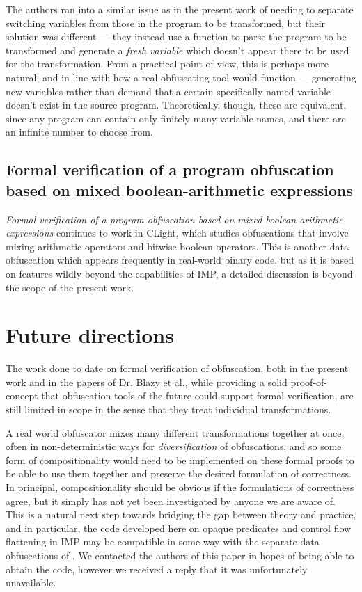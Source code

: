 \documentclass[12pt,notitlepage]{report}
\theoremstyle{plain}
\theoremstyle{definition}
\newcommand{\define}[1]{\emph{#1}\index{#1}}
\numberwithin{equation}{section}
\begin{document}
\par The authors ran into a similar issue as in the present work of needing to separate switching variables from those in the program to be transformed, but their solution was different --- they instead use a function to parse the program to be transformed and generate a \define{fresh variable} which doesn't appear there to be used for the transformation.  From a practical point of view, this is perhaps more natural, and in line with how a real obfuscating tool would function --- generating new variables rather than demand that a certain specifically named variable doesn't exist in the source program.  Theoretically, though, these are equivalent, since any program can contain only finitely many variable names, and there are an infinite number to choose from. 

\subsection*{Formal verification of a program obfuscation based on mixed boolean-arithmetic expressions}
\par \emph{Formal verification of a program obfuscation based on mixed boolean-arithmetic expressions} \cite{Blazy3} continues to work in CLight, which studies obfuscations that involve mixing arithmetic operators and bitwise boolean operators.  This is another data obfuscation which appears frequently in real-world binary code, but as it is based on features wildly beyond the capabilities of IMP, a detailed discussion is beyond the scope of the present work.

\section{Future directions}
The work done to date on formal verification of obfuscation, both in the present work and in the papers of Dr. Blazy et al., while providing a solid proof-of-concept that obfuscation tools of the future could support formal verification, are still limited in scope in the sense that they treat individual transformations.
\par A real world obfuscator mixes many different transformations together at once, often in non-deterministic ways for \define{diversification} of obfuscations, and so some form of compositionality would need to be implemented on these formal proofs to be able to use them together and preserve the desired formulation of correctness.  In principal, compositionality should be obvious if the formulations of correctness agree, but it simply has not yet been investigated by anyone we are aware of.  This is a natural next step towards bridging the gap between theory and practice, and in particular, the code developed here on opaque predicates and control flow flattening in IMP may be compatible in some way with the separate data obfuscations of \cite{Blazy1}.  We contacted the authors of this paper in hopes of being able to obtain the code, however we received a reply that it was unfortunately unavailable.
\end{document}

